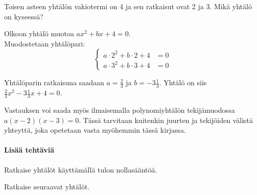 \begin{tehtavasivu}
\begin{tehtava}
    Toisen asteen yhtälön vakiotermi on 4 ja sen ratkaisut ovat 2 ja 3. Mikä yhtälö on kyseessä?

    \begin{vastaus}
		Olkoon yhtälö muotoa $ax^2+bx+4=0$. \\      
      Muodostetaan yhtälöpari:
      \[
        \left\{
          \begin{aligned}
            a\cdot 2^2 + b\cdot 2 + 4 &= 0 \\
            a\cdot 3^2 + b\cdot 3 + 4 &= 0
          \end{aligned}
        \right.
      \]
      
      Yhtälöparin ratkaisuna saadaan $a=\frac23$ ja $b=-3\frac13$. Yhtälö on siis
      $\frac{2}{3}x^2-3\frac{1}{3}x+4=0$.
      
      Vastauksen voi saada myös ilmaisemalla polynomiyhtälön tekijämuodossa $a(x-2)(x-3)=0$.
      Tässä tarvitaan kuitenkin juurten ja tekijöiden välistä yhteyttä, joka opetetaan vasta myöhemmin tässä kirjassa.
    \end{vastaus}
\end{tehtava}



\paragraph*{Lisää tehtäviä}

\begin{tehtava}
    Ratkaise yhtälöt käyttämällä tulon nollasääntöä.
    \begin{alakohdat}
    \end{alakohdat}
    \begin{vastaus}
        \begin{alakohdat}
        \end{alakohdat}
    \end{vastaus}
\end{tehtava}

\begin{tehtava}
    Ratkaise seuraavat yhtälöt.
    \begin{alakohdat}
    \end{alakohdat}
    \begin{vastaus}
        \begin{alakohdat}
        \end{alakohdat}
    \end{vastaus}
\end{tehtava}


\end{tehtavasivu}
